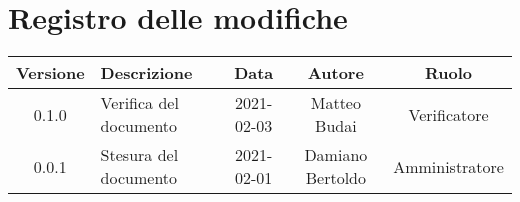 \section*{Registro delle modifiche}

\begin{center}
	\begin{longtable}{|c|p{5cm}|c|c|c|}
	\hline
	\rowcolor{lighter-grayer}
	\textbf{Versione} & \textbf{Descrizione} & \textbf{Data} & \textbf{Autore} & \textbf{Ruolo} \\
	\hline
	\endfirsthead


	\hline
	0.1.0 & Verifica del documento & 2021-02-03 & Matteo Budai & Verificatore \\
	\hline
	0.0.1 & Stesura del documento & 2021-02-01 & Damiano Bertoldo & Amministratore \\
	\hline
	\end{longtable}
\end{center}